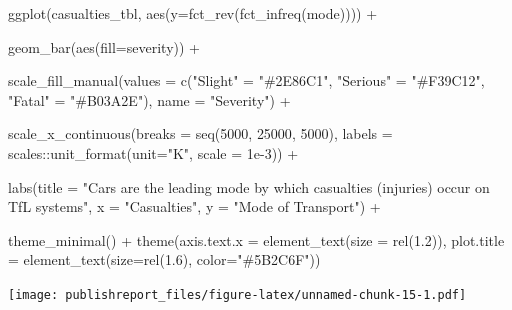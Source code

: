 \documentclass[
]{article}
\newenvironment{Shaded}{\begin{snugshade}}{\end{snugshade}}
\newcommand{\AttributeTok}[1]{\textcolor[rgb]{0.77,0.63,0.00}{#1}}
\newcommand{\DecValTok}[1]{\textcolor[rgb]{0.00,0.00,0.81}{#1}}
\newcommand{\FloatTok}[1]{\textcolor[rgb]{0.00,0.00,0.81}{#1}}
\newcommand{\FunctionTok}[1]{\textcolor[rgb]{0.00,0.00,0.00}{#1}}
\newcommand{\NormalTok}[1]{#1}
\newcommand{\OtherTok}[1]{\textcolor[rgb]{0.56,0.35,0.01}{#1}}
\newcommand{\SpecialCharTok}[1]{\textcolor[rgb]{0.00,0.00,0.00}{#1}}
\newcommand{\StringTok}[1]{\textcolor[rgb]{0.31,0.60,0.02}{#1}}
\begin{document}
\begin{Shaded}
\begin{Highlighting}[]
\FunctionTok{ggplot}\NormalTok{(casualties\_tbl, }\FunctionTok{aes}\NormalTok{(}\AttributeTok{y=}\FunctionTok{fct\_rev}\NormalTok{(}\FunctionTok{fct\_infreq}\NormalTok{(mode)))) }\SpecialCharTok{+}
    
    \FunctionTok{geom\_bar}\NormalTok{(}\FunctionTok{aes}\NormalTok{(}\AttributeTok{fill=}\NormalTok{severity)) }\SpecialCharTok{+}
    
    \FunctionTok{scale\_fill\_manual}\NormalTok{(}\AttributeTok{values =} \FunctionTok{c}\NormalTok{(}\StringTok{"Slight"} \OtherTok{=} \StringTok{"\#2E86C1"}\NormalTok{, }
                                 \StringTok{"Serious"} \OtherTok{=} \StringTok{"\#F39C12"}\NormalTok{, }
                                 \StringTok{"Fatal"} \OtherTok{=} \StringTok{"\#B03A2E"}\NormalTok{),}
                      \AttributeTok{name =} \StringTok{"Severity"}\NormalTok{) }\SpecialCharTok{+}
    
    \FunctionTok{scale\_x\_continuous}\NormalTok{(}\AttributeTok{breaks =} \FunctionTok{seq}\NormalTok{(}\DecValTok{5000}\NormalTok{, }\DecValTok{25000}\NormalTok{, }\DecValTok{5000}\NormalTok{),}
                       \AttributeTok{labels =}\NormalTok{ scales}\SpecialCharTok{::}\FunctionTok{unit\_format}\NormalTok{(}\AttributeTok{unit=}\StringTok{"K"}\NormalTok{, }\AttributeTok{scale =} \FloatTok{1e{-}3}\NormalTok{)) }\SpecialCharTok{+}
    
    \FunctionTok{labs}\NormalTok{(}\AttributeTok{title =} \StringTok{"Cars are the leading mode by which casualties (injuries) occur on TfL systems"}\NormalTok{,}
         \AttributeTok{x =} \StringTok{"Casualties"}\NormalTok{,}
         \AttributeTok{y =} \StringTok{"Mode of Transport"}\NormalTok{) }\SpecialCharTok{+}
    
    \FunctionTok{theme\_minimal}\NormalTok{() }\SpecialCharTok{+} 
    \FunctionTok{theme}\NormalTok{(}\AttributeTok{axis.text.x =} \FunctionTok{element\_text}\NormalTok{(}\AttributeTok{size =} \FunctionTok{rel}\NormalTok{(}\FloatTok{1.2}\NormalTok{)),}
          \AttributeTok{plot.title =} \FunctionTok{element\_text}\NormalTok{(}\AttributeTok{size=}\FunctionTok{rel}\NormalTok{(}\FloatTok{1.6}\NormalTok{), }\AttributeTok{color=}\StringTok{"\#5B2C6F"}\NormalTok{))}
\end{Highlighting}
\end{Shaded}

\texttt{[image: publishreport\_files/figure-latex/unnamed-chunk-15-1.pdf]}
\end{document}
